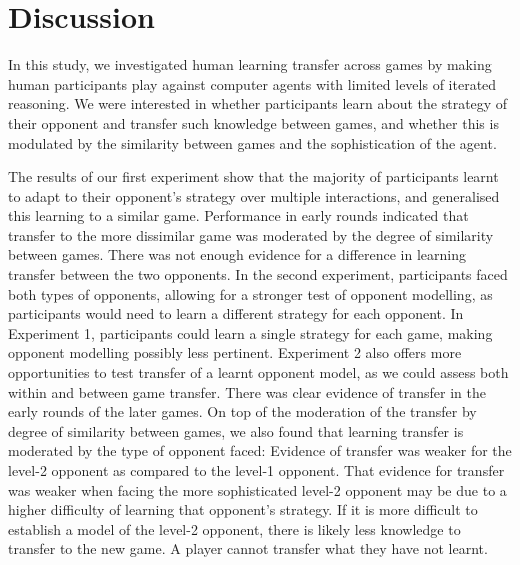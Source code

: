 \documentclass[man,floatsintext]{apa6}
\begin{document}
\hypertarget{discussion-2}{%
\section{Discussion}\label{discussion-2}}

In this study, we investigated human learning transfer across games by making human participants play against computer agents with limited levels of iterated reasoning. We were interested in whether participants learn about the strategy of their opponent and transfer such knowledge between games, and whether this is modulated by the similarity between games and the sophistication of the agent.

The results of our first experiment show that the majority of participants learnt to adapt to their opponent's strategy over multiple interactions, and generalised this learning to a similar game. Performance in early rounds indicated that transfer to the more dissimilar game was moderated by the degree of similarity between games. There was not enough evidence for a difference in learning transfer between the two opponents. In the second experiment, participants faced both types of opponents, allowing for a stronger test of opponent modelling, as participants would need to learn a different strategy for each opponent. In Experiment 1, participants could learn a single strategy for each game, making opponent modelling possibly less pertinent. Experiment 2 also offers more opportunities to test transfer of a learnt opponent model, as we could assess both within and between game transfer. There was clear evidence of transfer in the early rounds of the later games. On top of the moderation of the transfer by degree of similarity between games, we also found that learning transfer is moderated by the type of opponent faced: Evidence of transfer was weaker for the level-2 opponent as compared to the level-1 opponent. That evidence for transfer was weaker when facing the more sophisticated level-2 opponent may be due to a higher difficulty of learning that opponent's strategy. If it is more difficult to establish a model of the level-2 opponent, there is likely less knowledge to transfer to the new game. A player cannot transfer what they have not learnt.
\end{document}
